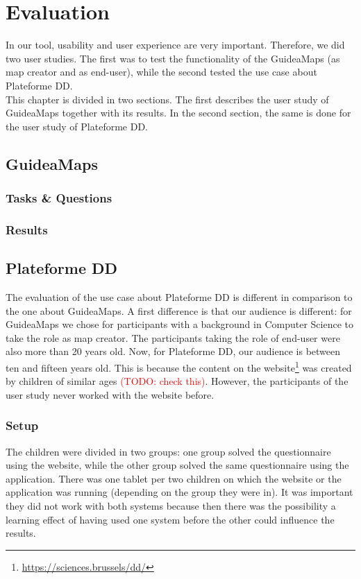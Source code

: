 \chapter{Evaluation}\label{ch:evaluation}

In our tool, usability and user experience are very important. Therefore, we did two user studies. The first was to test the functionality of the GuideaMaps (as map creator and as end-user), while the second tested the use case about Plateforme DD.\\

This chapter is divided in two sections. The first describes the user study of GuideaMaps together with its results. In the second section, the same is done for the user study of Plateforme DD.





\section{GuideaMaps}

\subsection{Tasks \& Questions}

\subsection{Results}





\section{Plateforme DD}
The evaluation of the use case about Plateforme DD is different in comparison to the one about GuideaMaps. A first difference is that our audience is different: for GuideaMaps we chose for participants with a background in Computer Science to take the role as map creator. The participants taking the role of end-user were also more than 20 years old. Now, for Plateforme DD, our audience is between ten and fifteen years old. This is because the content on the website\footnote{\url{https://sciences.brussels/dd/}} was created by children of similar ages \textcolor{red}{(TODO: check this)}. However, the participants of the user study never worked with the website before.

\subsection{Setup}
The children were divided in two groups: one group solved the questionnaire using the website, while the other group solved the same questionnaire using the application. There was one tablet per two children on which the website or the application was running (depending on the group they were in). It was important they did not work with both systems because then there was the possibility a learning effect of having used one system before the other could influence the results. 

